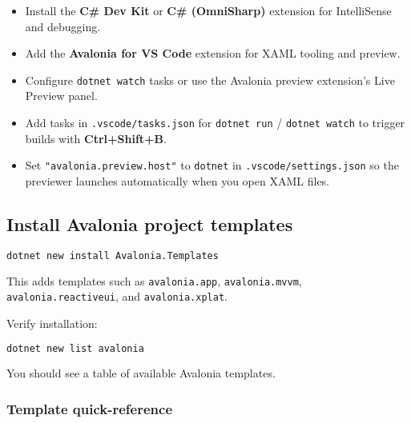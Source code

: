 \begin{itemize}
\tightlist
\item
  Install the \textbf{C\# Dev Kit} or \textbf{C\# (OmniSharp)} extension
  for IntelliSense and debugging.
\item
  Add the \textbf{Avalonia for VS Code} extension for XAML tooling and
  preview.
\item
  Configure \passthrough{\lstinline!dotnet watch!} tasks or use the
  Avalonia preview extension's Live Preview panel.
\item
  Add tasks in \passthrough{\lstinline!.vscode/tasks.json!} for
  \passthrough{\lstinline!dotnet run!} /
  \passthrough{\lstinline!dotnet watch!} to trigger builds with
  \textbf{Ctrl+Shift+B}.
\item
  Set \passthrough{\lstinline!"avalonia.preview.host"!} to
  \passthrough{\lstinline!dotnet!} in
  \passthrough{\lstinline!.vscode/settings.json!} so the previewer
  launches automatically when you open XAML files.
\end{itemize}

\subsection{Install Avalonia project
templates}\label{install-avalonia-project-templates}

\begin{lstlisting}[language=bash]
dotnet new install Avalonia.Templates
\end{lstlisting}

This adds templates such as \passthrough{\lstinline!avalonia.app!},
\passthrough{\lstinline!avalonia.mvvm!},
\passthrough{\lstinline!avalonia.reactiveui!}, and
\passthrough{\lstinline!avalonia.xplat!}.

Verify installation:

\begin{lstlisting}[language=bash]
dotnet new list avalonia
\end{lstlisting}

You should see a table of available Avalonia templates.

\subsubsection{Template quick-reference}\label{template-quick-reference}

